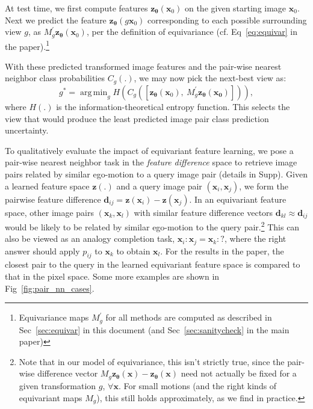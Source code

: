 \documentclass[10pt,twocolumn,letterpaper]{article}
\DeclareMathOperator*{\argmin}{arg\,min}
\newcommand{\cc}{}
\begin{document}
At test time, we first compute features $\mathbf{z}_{\bm{\theta}}(\bm{x}_0)$ on the given starting image $\bm{x}_0$. Next we predict the feature $\mathbf{z}_{\bm{\theta}}(g \bm{x}_0)$ corresponding to each possible surrounding view $g$, as $M_g^\prime \mathbf{z}_{\bm{\theta}}(\bm{x}_0)$, per the definition of equivariance (cf. Eq~\ref{eq:equivar} in the paper).\footnote{Equivariance maps $M_g^\prime$ for all methods are computed as described in Sec~\ref{sec:equivar} in this document (and Sec~\ref{sec:sanitycheck} in the main paper)}%

With these predicted transformed image features and the pair-wise nearest neighbor class probabilities $C_g(.)$, we may now pick the next-best view as:
\begin{equation}
g^*=\argmin_g H(C_g([\mathbf{z}_{\bm{\theta}}(\bm{x}_0),~  M_g^\prime \mathbf{z}_{\bm{\theta}}(\bm{x_0})])),
  \label{eq:nbv}
\end{equation}
where $H(.)$ is the information-theoretical entropy function. This selects the view that would produce the least predicted image pair class prediction uncertainty.

To qualitatively evaluate the impact of equivariant feature learning, we pose a pair-wise nearest neighbor task in the \emph{feature difference} space to retrieve image pairs related by similar ego-motion to a query image pair (details in Supp).
Given a learned feature space $\mathbf{z(.)}$ and a query image pair $(\bm{x}_i,\bm{x}_j)$, we form the pairwise feature difference  $\bm{d}_{ij}=\mathbf{z}(\bm{x}_i)-\mathbf{z}(\bm{x}_j)$.
In an equivariant feature space, other image pairs $(\bm{x}_k,\bm{x}_l)$ with similar feature difference vectors $\bm{d}_{kl}\approx \bm{d}_{ij}$ would be likely to be related by similar ego-motion to the query pair.\footnote{\cc{Note that in our model of equivariance, this isn't strictly true, since the pair-wise difference vector $M_g\mathbf{z_{\bm{\theta}}}(\bm{x})-\mathbf{z_{\bm{\theta}}}(\bm{x})$ need not actually be fixed for a given transformation $g$, $\forall\bm{x}$. For small motions (and the right kinds of equivariant maps $M_g$), this still holds approximately, as we find in practice.}}  This can also be viewed as an analogy completion task, $\bm{x}_i : \bm{x}_j = \bm{x}_k : ?$, where the right answer should apply $p_{ij}$ to $\bm{x}_k$ to obtain $\bm{x}_l$. For the results in the paper, the closest pair to the query in the learned equivariant feature space is compared to that in the pixel space. Some more examples are shown in Fig~\ref{fig:pair_nn_cases}.
\end{document}
